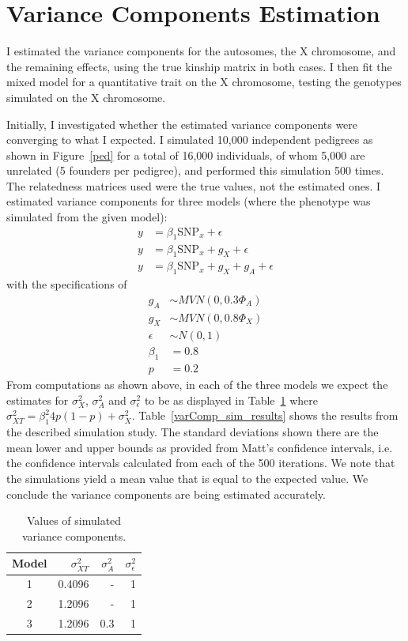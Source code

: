 \documentclass[11pt]{article} %
\newcommand{\snpX}{\mbox{SNP}_x}
\begin{document}
\section*{Variance Components Estimation}
I estimated the variance components for the autosomes, the X chromosome, and the remaining effects, using the true kinship matrix in both cases.
I then fit the mixed model for a quantitative trait on the X chromosome, testing the genotypes simulated on the X chromosome.

Initially, I investigated whether the estimated variance components were converging to what I expected. 
I simulated 10,000 independent pedigrees as shown in Figure~\ref{ped} for a total of 16,000 individuals, of whom 5,000 are unrelated (5 founders per pedigree), and performed this simulation 500 times. The relatedness matrices used were the true values, not the estimated ones. I estimated variance components for three models (where the phenotype was simulated from the given model): 
\begin{align}
\label{model1} y&=\beta_1 \snpX +\epsilon \\
\label{model2} y&=\beta_1 \snpX + g_X + \epsilon\\
\label{model3} y&=\beta_1 \snpX + g_X + g_A + \epsilon 
\end{align} with the specifications of 
\begin{align*}
g_A &\sim MVN(0,0.3 \Phi_A) \\
g_X &\sim MVN(0,0.8 \Phi_X) \\
\epsilon &\sim N(0,1)\\
\beta_1 &= 0.8 \\
p&=0.2
\end{align*}
From computations as shown above, in each of the three models we expect the estimates for $\sigma^2_X$,  $\sigma^2_A$ and $\sigma^2_\epsilon$ to be as displayed in Table~\ref{simMetrics} where $\sigma^2_{XT} = \beta_1^2 4 p(1-p) + \sigma_X^2$.
Table~\ref{varComp_sim_results} shows the results from the described simulation study. The standard deviations shown there are the mean lower and upper bounds as provided from Matt's confidence intervals, i.e. the confidence intervals calculated from each of the 500 iterations. We note that the simulations yield a mean value that is equal to the expected value. We conclude the variance components are being estimated accurately.

\bgroup
\def\arraystretch{1.5}
\begin{table}[ht]
\centering
\begin{tabular}{crrr}
  \hline
 Model & $\sigma^2_{XT}$ &  $\sigma^2_A$& $\sigma^2_\epsilon$  \\ 
  \hline
1 & 0.4096& -  & 1  \\
2 &1.2096& - & 1 \\
3 & 1.2096 & 0.3 & 1\\ 
   \hline
\end{tabular} 
\caption{Values of simulated variance components.}\label{simMetrics}
\end{table} 
\end{document}
